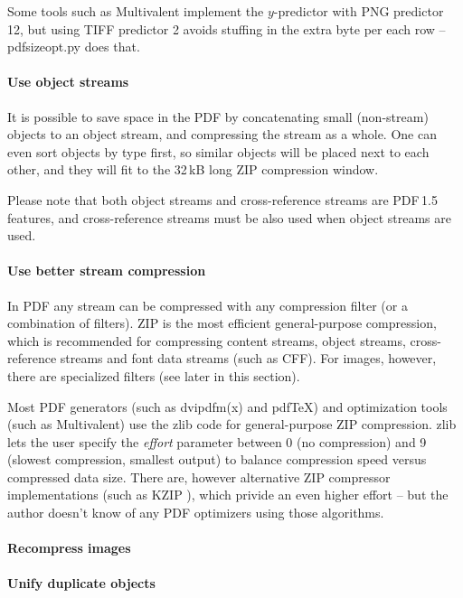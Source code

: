 \documentclass{ltugproc}
\def\cmd{\textsf}
\def\pkg{\textsf}
\begin{document}
Some tools such as Multivalent implement the $y$-predictor with PNG
predictor 12, but using TIFF predictor 2 avoids stuffing in the extra byte
per each row -- \cmd{pdfsizeopt.py} does that.

\paragraph{Use object streams}

It is possible to save space in the PDF by concatenating small (non-stream)
objects to an object stream, and compressing the stream as a whole. One can
even sort objects by type first, so similar objects will be placed next to
each other, and they will fit to the 32\,kB long ZIP compression window.

Please note that both object streams and cross-reference streams are
PDF\,1.5 features, and cross-reference streams must be also used when object
streams are used.

\paragraph{Use better stream compression}

In PDF any stream can be compressed with any compression filter (or a
combination of filters). ZIP is the most efficient general-purpose
compression, which is recommended for compressing content streams, object
streams, cross-reference streams and font data streams (such as CFF).
For images, however, there are specialized filters (see later in this
section).

Most PDF generators (such as \cmd{dvipdfm(x)} and pdf\TeX{}) and
optimization tools (such as Multivalent)
use the \pkg{zlib} code for general-purpose ZIP compression.
\pkg{zlib} lets the user specify the \emph{effort} parameter between 0 (no
compression) and 9 (slowest compression, smallest output) to balance
compression speed versus compressed data size. There are, however
alternative ZIP compressor implementations (such as KZIP \cite{kzip}), which
privide an even higher effort -- but the author doesn't know of any PDF
optimizers using those algorithms.

\paragraph{Recompress images}

\paragraph{Unify duplicate objects}
\end{document}
